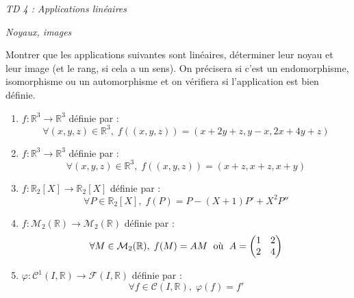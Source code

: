 \documentclass[a4paper,10pt]{report}
\begin{document}
\everymath{\displaystyle}
\begin{center}
\textit{{ {\huge TD 4 : Applications linéaires}}}
\end{center}

\bigskip

\medskip

\begin{center}
\textit{{ {\large Noyaux, images}}}
\end{center}


\begin{Exa} Montrer que les applications suivantes sont linéaires, déterminer leur noyau et leur image (et le rang, si cela a un sens). On précisera si c'est un endomorphisme, isomorphisme ou un automorphisme et on vérifiera si l'application est bien définie.

\begin{enumerate}
\item $f : \mathbb{R}^3 \rightarrow \mathbb{R}^3$ définie par :
$$ \forall (x,y,z) \in \mathbb{R}^3, \; f((x,y,z))= (x+2y+z,y-x,2x+4y+z)$$
\item $f : \mathbb{R}^3 \rightarrow \mathbb{R}^3$ définie par :
$$ \forall (x,y,z) \in \mathbb{R}^3, \; f((x,y,z))= (x+z,x+z,x+y)$$
\item $f : \mathbb{R}_2[X] \rightarrow \mathbb{R}_2[X]$ définie par :
$$ \forall P \in \mathbb{R}_2[X], \; f(P)=P-(X+1)P'+X^2 P''$$
\item $f : \mathcal{M}_2(\mathbb{R}) \rightarrow \mathcal{M}_2(\mathbb{R})$ définie par :
$$ \forall M \in \mathcal{M}_2(\mathbb{R}), \; f(M)=AM \; \hbox{ où } \; A= \begin{pmatrix}
1 & 2 \\
2 & 4 \\
\end{pmatrix} $$
\item $\varphi : \mathcal{C}^1(I, \mathbb{R}) \rightarrow \mathcal{F}(I, \mathbb{R})$ définie par :
$$ \forall f \in \mathcal{C}(I, \mathbb{R}), \; \varphi(f)=f'$$
\end{enumerate}
\end{Exa}

\corr 
\end{document}
